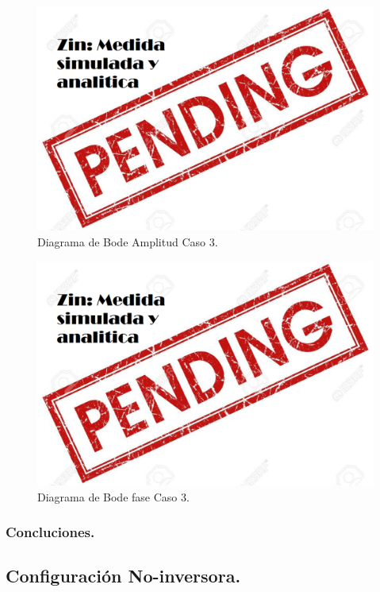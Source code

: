 \begin{figure}[H]	
	\centering
	\includegraphics[width=\textwidth]{Ejercicio1/Imagenes/BodeC3.png}
	\caption{Diagrama de Bode Amplitud Caso 3.}
	\label{fig:BodeC3}
\end{figure} 
\begin{figure}[H]	
	\centering
	\includegraphics[width=\textwidth]{Ejercicio1/Imagenes/BodephC3.png}
	\caption{Diagrama de Bode fase Caso 3.}
	\label{fig:BodephC3}
\end{figure} 
\subsubsection{Concluciones.}
\subsection{Configuración No-inversora.}
